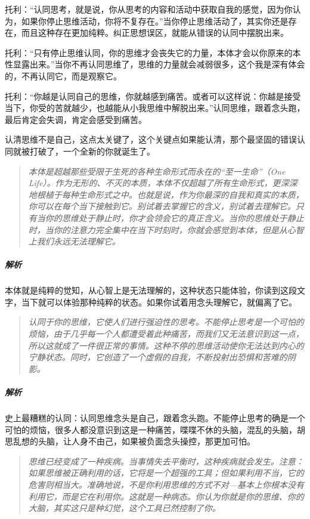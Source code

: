 托利：“认同思考，就是说，你从思考的内容和活动中获取自我的感觉，因为你认为，如果你停止思维活动，你将不复存在。”当你停止思维活动了，其实你还是存在，而且这种存在更加纯粹。纠正思想误区，就能从错误的认同中摆脱出来。

托利：“只有停止思维认同，你的思维才会丧失它的力量，本体才会以你原来的本性显露出来。”当你不再认同思维了，思维的力量就会减弱很多，这个我是深有体会的，不再认同它，而是观察它。

托利：“你越是认同自己的思维，你就越感到痛苦。或者可以这样说：你越是接受当下，你受的苦就越少，也越能从小我思维中解脱出来。”认同思维，跟着念头跑，最后肯定会失调，肯定会感受到痛苦。

认清思维不是自己，这点太关键了，这个关键点如果能认清，那个最坚固的错误认同就被打破了，一个全新的你就诞生了。

\begin{quote}\it
    本体是超越那些受限于生死的各种生命形式而永在的“至一生命”（One Life）。作为无形的、不灭的本质，本体不仅超越了所有生命形式，更深深地根植于每种生命形式之中。也就是说，作为你最深的自我和真实的本质，你可以在每个当下接触到它。别试着去掌握它的含义，别试着去理解它。只有当你的思维处于静止时，你才会领会它的真正含义。当你的思维处于静止时，当你的注意力完全集中在当下时刻时，你就会感觉到本体，但是从心智上我们永远无法理解它。
\end{quote}

\subparagraph{解析} 本体就是纯粹的觉知，从心智上是无法理解的，这种状态只能体验，你读到这段文字，当下就可以体验那种纯粹的状态。如果你试着用念头理解它，就偏离了它。

\begin{quote}\it
    认同于你的思维，它使人们进行强迫性的思考。不能停止思考是一个可怕的烦恼，由于几乎每一个人都遭受着此种痛苦，而我们又无法意识到这一点，所以这就成了一件很正常的事情。这种不停的思维活动使你无法达到内心的宁静状态。同时，它创造了一个虚假的自我，不断投射出恐惧和苦难的阴影。
\end{quote}

\subparagraph{解析} 史上最糟糕的认同：认同思维念头是自己，跟着念头跑。不能停止思考的确是一个可怕的烦恼，很多人都没意识到这是一种痛苦，喋喋不休的头脑，混乱的头脑，胡思乱想的头脑，让人身不由己，如果被负面念头操控，那更加可怕。

\begin{quote}\it
    思维已经变成了一种疾病。当事情失去平衡时，这种疾病就会发生。注意：如果思维被正确利用的话，它将是一个超强的工具；但如果利用不当，它的危害则相当大。准确地说，不是你利用思维的方式不对—基本上你根本没有利用它，而是它在利用你。这就是一种病态。你认为你就是你的思维、你的大脑，其实这只是种幻觉，这个工具已然控制了你。
\end{quote}

